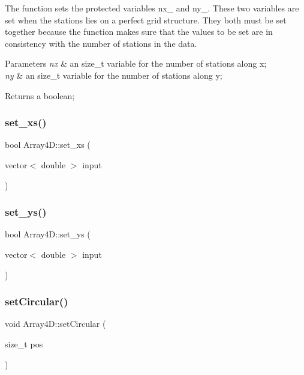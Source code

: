 The function sets the protected variables nx\+\_\+ and ny\+\_\+. These two variables are set when the stations lies on a perfect grid structure. They both must be set together because the function makes sure that the values to be set are in consistency with the number of stations in the data.


\begin{DoxyParams}{Parameters}
{\em nx} & an size\+\_\+t variable for the number of stations along x; \\
\hline
{\em ny} & an size\+\_\+t variable for the number of stations along y; \\
\hline
\end{DoxyParams}
\begin{DoxyReturn}{Returns}
a boolean; 
\end{DoxyReturn}
\mbox{\label{class_array4_d_aca331683d3d0d0922e06aa15c89f6c8a}} 
\subsubsection{\texorpdfstring{set\+\_\+xs()}{set\_xs()}}
{\footnotesize\ttfamily bool Array4\+D\+::set\+\_\+xs (\begin{DoxyParamCaption}\item[{vector$<$ double $>$}]{input }\end{DoxyParamCaption})}

\mbox{\label{class_array4_d_a5f356e5e2b6c0bf059cfcb1ecb5891c8}} 
\subsubsection{\texorpdfstring{set\+\_\+ys()}{set\_ys()}}
{\footnotesize\ttfamily bool Array4\+D\+::set\+\_\+ys (\begin{DoxyParamCaption}\item[{vector$<$ double $>$}]{input }\end{DoxyParamCaption})}

\mbox{\label{class_array4_d_ab4574e45a22610a3e9768542afe76797}} 
\subsubsection{\texorpdfstring{set\+Circular()}{setCircular()}}
{\footnotesize\ttfamily void Array4\+D\+::set\+Circular (\begin{DoxyParamCaption}\item[{size\+\_\+t}]{pos }\end{DoxyParamCaption})}

